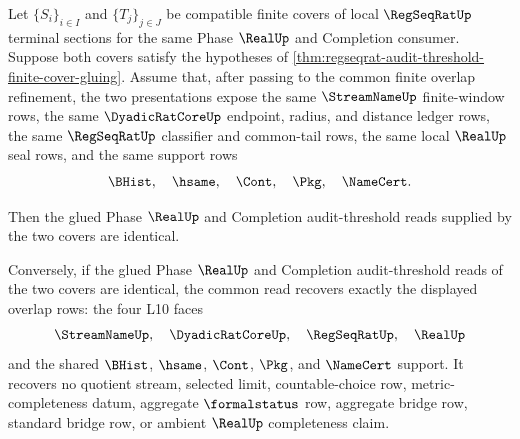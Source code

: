 \begin{theorem}
\label{thm:regseqrat-finite-cover-overlap-no-confusion}
Let $\{S_i\}_{i \in I}$ and $\{T_j\}_{j \in J}$ be compatible finite covers of local $\RegSeqRatUp$ terminal sections for the same Phase $\RealUp$ and Completion consumer. Suppose both covers satisfy the hypotheses of \autoref{thm:regseqrat-audit-threshold-finite-cover-gluing}. Assume that, after passing to the common finite overlap refinement, the two presentations expose the same $\StreamNameUp$ finite-window rows, the same $\DyadicRatCoreUp$ endpoint, radius, and distance ledger rows, the same $\RegSeqRatUp$ classifier and common-tail rows, the same local $\RealUp$ seal rows, and the same support rows
$$
\BHist,\quad \hsame,\quad \Cont,\quad \Pkg,\quad \NameCert.
$$

Then the glued Phase $\RealUp$ and Completion audit-threshold reads supplied by the two covers are identical.

Conversely, if the glued Phase $\RealUp$ and Completion audit-threshold reads of the two covers are identical, the common read recovers exactly the displayed overlap rows: the four L10 faces
$$
\StreamNameUp,\quad \DyadicRatCoreUp,\quad \RegSeqRatUp,\quad \RealUp
$$
and the shared $\BHist$, $\hsame$, $\Cont$, $\Pkg$, and $\NameCert$ support. It recovers no quotient stream, selected limit, countable-choice row, metric-completeness datum, aggregate $\formalstatus$ row, aggregate bridge row, standard bridge row, or ambient $\RealUp$ completeness claim.
\end{theorem}
